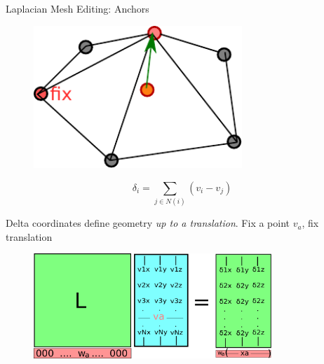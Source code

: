 \documentclass{beamer}
\begin{document}
\begin{frame}{Laplacian Mesh Editing: Anchors}

\begin{minipage}{0.45\textwidth}{
\begin{figure}[t]
    \includegraphics[width=0.7\textwidth]{2DDiscreteCurvatureAnchor1.pdf}
\end{figure}
}
\end{minipage}
\begin{minipage}{0.45\textwidth}
\[ \delta_i = \sum_{j \in N(i)} (v_i - v_j)\]

Delta coordinates define geometry {\em up to a translation}.  Fix a point $v_a$, fix translation
\end{minipage}

\begin{figure}[t]
    \includegraphics[width=0.8\textwidth]{LaplacianReconstruction1Anchor.pdf}
\end{figure}

\end{frame}
\end{document}
